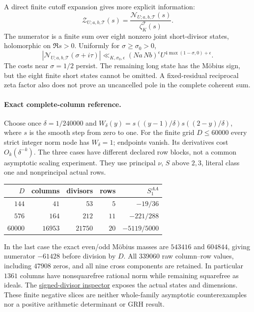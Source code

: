 A direct finite cutoff expansion gives more explicit information:
\begin{equation}\label{sd:finite-numerator}
 \mathcal Z_{U;a,b,\mathcal T}(s)
       =\frac{\mathcal N_{U;a,b,\mathcal T}(s)}
                    {\zeta_K^{\mathcal T}(s)}.
\end{equation}
The numerator is a finite sum over eight nonzero joint short-divisor
states, holomorphic on $\Re s>0$. Uniformly for $\sigma\ge\sigma_0>0$,
\[
 |\mathcal N_{U;a,b,\mathcal T}(\sigma+i\tau)|
 \ll_{K,\sigma_0,\epsilon}(Na\,Nb)^\epsilon
             U^{4\max(1-\sigma,0)+\epsilon}.
\]
The costs near $\sigma=1/2$ persist. The remaining long state has the
M\"obius sign, but the eight finite short states cannot be omitted.
A fixed-residual reciprocal zeta factor also does not prove an
uncancelled pole in the complete coherent sum.

\paragraph{Exact complete-column reference.}
Choose once $\delta=1/240000$ and
$W_\delta(y)=s((y-1)/\delta)s((2-y)/\delta)$, where $s$ is the smooth
step from zero to one. For the finite grid $D\le60000$ every strict
integer norm node has $W_\delta=1$; endpoints vanish. Its derivatives
cost $O_k(\delta^{-k})$. The three cases have different declared row
blocks, not a common asymptotic scaling experiment. They use principal
$\nu$, $S$ above $2,3$, literal class one and nonprincipal actual rows.
\begin{center}
\begin{tabular}{r|r|r|r|r}
 $D$ & columns & divisors & rows & $S_1^{AA}$\\\hline
 $144$ & $41$ & $53$ & $5$ & $-19/36$\\
 $576$ & $164$ & $212$ & $11$ & $-221/288$\\
 $60000$ & $16953$ & $21750$ & $20$ & $-5119/5000$
\end{tabular}
\end{center}
In the last case the exact even/odd M\"obius masses are
$543416$ and $604844$, giving numerator $-61428$ before division by $D$.
All $339060$ raw column--row values, including $47908$ zeros, and all nine
cross components are retained. In particular $1361$ columns have
nonsquarefree rational norm while remaining squarefree as ideals.
The \href{https://amelie-iska.github.io/GRH-research/signed-divisor.html}{signed-divisor inspector}
exposes the actual states and dimensions. These finite negative slices
are neither whole-family asymptotic counterexamples nor a positive
arithmetic determinant or GRH result.
